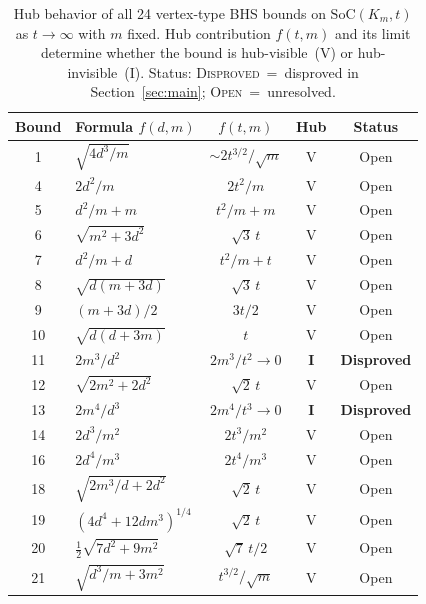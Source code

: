 \documentclass[preprint,12pt]{elsarticle}
\theoremstyle{definition}
\theoremstyle{remark}
\newcommand{\SoC}{\mathrm{SoC}}       %
\begin{document}
\begin{table}[t]
  \centering
  \caption{Hub behavior of all 24 vertex-type BHS bounds on $\SoC(K_m, t)$
    as $t \to \infty$ with $m$ fixed.  Hub contribution $f(t,m)$ and its
    limit determine whether the bound is hub-visible~(V) or
    hub-invisible~(I).  Status:
    \textsc{Disproved}~=~disproved in Section~\ref{sec:main};
    \textsc{Open}~=~unresolved.}
  \label{tab:hub-classification}
  \begin{tabular}{clccc}
    \toprule
    Bound & Formula $f(d,m)$ & $f(t,m)$ & Hub & Status \\
    \midrule
    1  & $\sqrt{4d^3/m}$           & $\sim 2t^{3/2}/\sqrt{m}$   & V & Open \\
    4  & $2d^2/m$                  & $2t^2/m$                    & V & Open \\
    5  & $d^2/m + m$               & $t^2/m + m$                 & V & Open \\
    6  & $\sqrt{m^2+3d^2}$         & $\sqrt{3}\,t$               & V & Open \\
    7  & $d^2/m + d$               & $t^2/m + t$                 & V & Open \\
    8  & $\sqrt{d(m+3d)}$          & $\sqrt{3}\,t$               & V & Open \\
    9  & $(m+3d)/2$                & $3t/2$                      & V & Open \\
    10 & $\sqrt{d(d+3m)}$          & $t$                         & V & Open \\
    11 & $2m^3/d^2$                & $2m^3/t^2 \to 0$            & \textbf{I} & \textbf{Disproved} \\
    12 & $\sqrt{2m^2+2d^2}$        & $\sqrt{2}\,t$               & V & Open \\
    13 & $2m^4/d^3$                & $2m^4/t^3 \to 0$            & \textbf{I} & \textbf{Disproved} \\
    14 & $2d^3/m^2$                & $2t^3/m^2$                  & V & Open \\
    16 & $2d^4/m^3$                & $2t^4/m^3$                  & V & Open \\
    18 & $\sqrt{2m^3/d+2d^2}$      & $\sqrt{2}\,t$               & V & Open \\
    19 & $(4d^4{+}12dm^3)^{1/4}$   & $\sqrt{2}\,t$               & V & Open \\
    20 & $\tfrac{1}{2}\sqrt{7d^2{+}9m^2}$ & $\sqrt{7}\,t/2$      & V & Open \\
    21 & $\sqrt{d^3/m+3m^2}$       & $t^{3/2}/\sqrt{m}$          & V & Open \\

\end{tabular}
\end{table}
\end{document}
